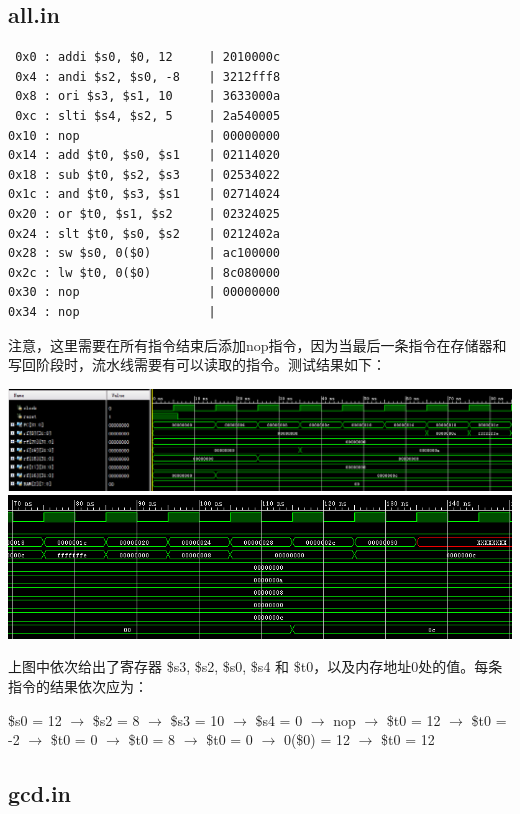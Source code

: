 \documentclass[12pt]{article} %
\begin{document}
\begin{sloppypar}
\subsection{all.in}

\begin{lstlisting}
 0x0 : addi $s0, $0, 12     | 2010000c
 0x4 : andi $s2, $s0, -8    | 3212fff8
 0x8 : ori $s3, $s1, 10     | 3633000a
 0xc : slti $s4, $s2, 5     | 2a540005
0x10 : nop                  | 00000000
0x14 : add $t0, $s0, $s1    | 02114020
0x18 : sub $t0, $s2, $s3    | 02534022
0x1c : and $t0, $s3, $s1    | 02714024
0x20 : or $t0, $s1, $s2     | 02324025
0x24 : slt $t0, $s0, $s2    | 0212402a
0x28 : sw $s0, 0($0)        | ac100000
0x2c : lw $t0, 0($0)        | 8c080000
0x30 : nop                  | 00000000
0x34 : nop                  | 
\end{lstlisting} 

注意，这里需要在所有指令结束后添加nop指令，因为当最后一条指令在存储器和写回阶段时，流水线需要有可以读取的指令。测试结果如下：

\noindent
\includegraphics[width =\linewidth]{figure/all1.png}
\includegraphics[width =\linewidth]{figure/all2.png}

上图中依次给出了寄存器 \$s3, \$s2, \$s0, \$s4 和 \$t0，以及内存地址0处的值。每条指令的结果依次应为：

\$s0 = 12 $\rightarrow$
\$s2 = 8 $\rightarrow$
\$s3 = 10 $\rightarrow$
\$s4 = 0 $\rightarrow$
nop $\rightarrow$
\$t0 = 12 $\rightarrow$
\$t0 = -2 $\rightarrow$
\$t0 = 0 $\rightarrow$
\$t0 = 8 $\rightarrow$
\$t0 = 0 $\rightarrow$
0(\$0) = 12 $\rightarrow$
\$t0 = 12


\subsection{gcd.in}


\end{sloppypar}
\end{document}
